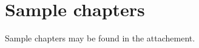 \documentclass[10pt, article, one side]{memoir}
\begin{document}
    \chapter{Sample chapters}
    Sample chapters may be found in the attachement.

    
    

\end{document}
